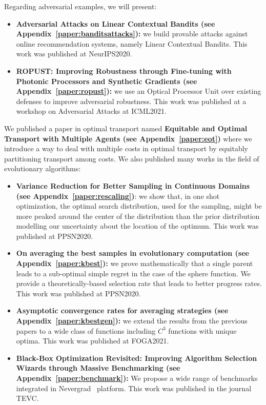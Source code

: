 Regarding adversarial examples, we will present:
\begin{itemize}
    \item \textbf{Adversarial Attacks on Linear Contextual Bandits (see Appendix~\ref{paper:banditsattacks}):} we build provable attacks against online recommendation systems, namely Linear Contextual Bandits. This work was published at NeurIPS2020.
    \item \textbf{ROPUST: Improving Robustness through Fine-tuning with Photonic Processors and Synthetic Gradients (see Appendix~\ref{paper:ropust}):} we use an Optical Processor Unit over existing defenses to improve adversarial robustness. This work was published at a workshop on Adversarial Attacks at ICML2021.
\end{itemize}
We  published a paper in optimal transport named \textbf{Equitable and Optimal Transport with Multiple Agents (see Appendix~\ref{paper:eot})} where we introduce a way to deal with multiple costs in optimal transport by equitably partitioning transport among costs.
We also published many works in the field of evolutionary algorithms:
\begin{itemize}

    \item \textbf{Variance Reduction for Better Sampling in Continuous Domains (see Appendix~\ref{paper:rescaling})}: we show that, in one shot optimization, the optimal search distribution, used for the sampling, might be more peaked around the center of the distribution than the prior distribution modelling our uncertainty about the location of the optimum. This work was published at PPSN2020.
    \item \textbf{On averaging the best samples in evolutionary computation (see Appendix~\ref{paper:kbest}):}  we prove mathematically that a single parent leads to a sub-optimal simple regret in the case of the sphere function. We provide a theoretically-based selection rate that leads to better progress rates. This work was published at PPSN2020.
    \item \textbf{Asymptotic convergence rates for averaging strategies (see Appendix~\ref{paper:kbestgen}):} we extend the results from the previous papers to a wide class of functions including $C^3$ functions with unique optima. This work was published at FOGA2021.
    \item  \textbf{Black-Box Optimization Revisited: Improving Algorithm Selection Wizards through Massive Benchmarking (see Appendix~\ref{paper:benchmark}):} We propose a wide range of benchmarks integrated in Nevergrad~\citep{nevergrad} platform. This work was published in the journal TEVC.
    
\end{itemize}

